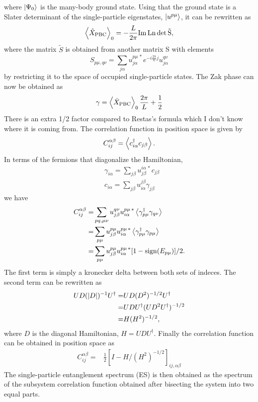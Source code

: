 \documentclass[twocolumn,amsmath,longbibliography,amssymb,superscriptaddress]{revtex4-1}
\newcommand{\carlos}[1]{{\color{red} #1}}
\begin{document}
where $\ket{\Psi_0}$ is the many-body ground state. Using that the ground state is a Slater determinant of the single-particle eigenstates, $\ket{u^{p\mu}}$, it can be rewritten as
\begin{align*}
\expval{\hat{X}_{\rm PBC}}_0 = -\frac{L}{2\pi} \rm{Im \, Ln}\, {\rm det} \, \tilde{S},
\end{align*}
where the matrix $\tilde{S}$ is obtained from another matrix S with elements
\begin{equation}
S_{p\mu,q\nu} = \sum_{j\alpha}u^{p\mu\, \ast}_{j \alpha} e^{-i\frac{2\pi}{L}j}u^{q\nu}_{j \alpha}
\end{equation}
by restricting it to the space of occupied single-particle states. The Zak phase can now be obtained as
\begin{equation}
\gamma = \expval{\hat{X}_{\rm PBC}}_0\frac{2\pi}{L} + \frac{1}{2}
\end{equation}
\carlos{There is an extra 1/2 factor compared to Restas's formula which I don't know where it is coming from.}
The correlation function in position space is given by
\begin{align*}
C_{ij}^{\alpha \beta} = \expval{c_{i\alpha}^\dagger c_{j\beta}}.
\end{align*}
In terms of the fermions that diagonalize the Hamiltonian, 
\begin{align*}
& \gamma_{i\alpha} = \sum_{j\beta}u_{j\beta}^{i\alpha \, \ast} c_{j\beta} \\
& c_{i\alpha} = \sum_{j\beta} u^{j\beta}_{i\alpha} \gamma_{j\beta}
\end{align*}
we have
\begin{align*}
C_{ij}^{\alpha \beta} =& \sum_{pq,\mu\nu} u^{q\nu }_{j\beta} u^{p\mu \, \ast}_{i\alpha} \expval{\gamma^\dagger_{p\mu} \gamma_{q\nu} } \\
=&  \sum_{p\mu} u^{p\mu }_{j\beta} u^{p\mu \, \ast}_{i\alpha} \expval{\gamma^\dagger_{p\mu} \gamma_{p\mu} } \\
=&  \sum_{p\mu} u^{p\mu }_{j\beta} u^{p\mu \, \ast}_{i\alpha} [1-{\rm sign}(E_{p\mu})]/2.
\end{align*}
The first term is simply a kronecker delta between both sets of indeces. The second term can be rewritten as
\begin{align*}
UD(\abs{D})^{-1}U^\dagger =& UD(D^2)^{-1/2}U^\dagger \\
=& U D U^\dagger (U D^2 U^\dagger)^{-1/2} \\
=& H(H^2)^{-1/2},
\end{align*}
where $D$ is the diagonal Hamiltonian, $H=UDU^\dagger$. Finally the correlation function can be obtained in position space as
\begin{align*}
C_{ij}^{\alpha \beta} =& \frac{1}{2}\left[I - H/ (H^2)^{-1/2} \right]_{ij, \alpha \beta}
\end{align*}
The single-particle entanglement spectrum (ES) is then obtained as the spectrum of the subsystem correlation function obtained after bisecting the system into two equal parts. 
\end{document}
